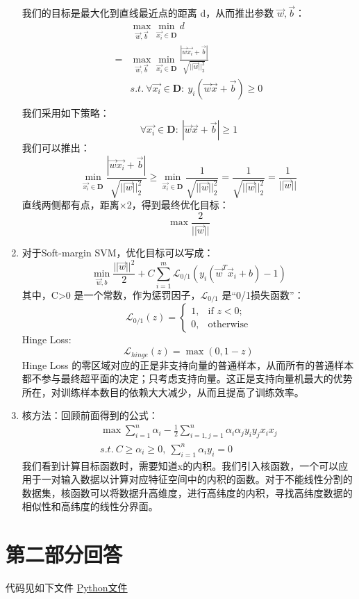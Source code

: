 \documentclass[a4paper,11pt,onecolumn,oneside,UTF8]{article}
\begin{document}
\begin{enumerate}
$$          $$
          我们的目标是最大化到直线最近点的距离 d，从而推出参数 $\vec{w},\vec{b}$：
          $$
              \begin{aligned}
                    & \max\limits_{\vec{w},\vec{b}}\min\limits_{\vec{x_i}\in\mathbf{D}} d                                                         \\
                  = & \max\limits_{\vec{w},\vec{b}}\min\limits_{\vec{x_i}\in\mathbf{D}} \frac{|\vec{w}\vec{x_i}+\vec{b}|}{\sqrt{||\vec{w}||_2^2}} \\
                    & s.t.\ \forall \vec{x_i}\in\mathbf{D}:\ y_i\left(\vec{w}\vec{x}+\vec{b}\right)\geq 0                                         \\
              \end{aligned}
          $$
          我们采用如下策略：
          $$
              \forall \vec{x_i}\in\mathbf{D}:\ |\vec{w}\vec{x}+\vec{b}|\geq 1
          $$
          我们可以推出：
          $$
              \min\limits_{\vec{x_i}\in\mathbf{D}} \frac{|\vec{w}\vec{x_i}+\vec{b}|}{\sqrt{||\vec{w}||_2^2}}\geq \min\limits_{\vec{x_i}\in\mathbf{D}} \frac{1}{\sqrt{||\vec{w}||_2^2}} = \frac{1}{\sqrt{||\vec{w}||_2^2}} = \frac{1}{||\vec{w}||}
          $$
          直线两侧都有点，距离×2，得到最终优化目标：
          $$
              \max \frac{2}{||\vec{w}||}
          $$
    \item
          对于Soft-margin SVM，优化目标可以写成：
          $$
              \min\limits_{\vec{w},b}\frac{||\vec{w}||^2}{2}+C\sum\limits_{i=1}^m \mathscr{L}_{0/1}\left(y_i\left(\vec{w}^T\vec{x}_i+b\right)-1\right)
          $$
          其中，C>0 是一个常数，作为惩罚因子，$\mathscr{L}_{0/1}$ 是“0/1损失函数”：
          $$
              \mathscr{L}_{0/1}\left(z\right) = \left\{\begin{array}{ll}
                  1, & \text{if }z<0;   \\
                  0, & \text{otherwise}
              \end{array}
              \right.
          $$
          Hinge Loss:
          $$
              \mathscr{L}_{hinge}\left(z\right) = \max\left(0,1-z\right)
          $$
          Hinge Loss 的零区域对应的正是非支持向量的普通样本，从而所有的普通样本都不参与最终超平面的决定；只考虑支持向量。这正是支持向量机最大的优势所在，对训练样本数目的依赖大大减少，从而且提高了训练效率。
    \item
          核方法：回顾前面得到的公式：
          $$
              \begin{aligned}
                  \max \sum \limits_{i=1}^n\alpha_i-\frac{1}{2}\sum\limits_{i=1,j=1}^n\alpha_i\alpha_jy_iy_jx_ix_j \\
                  s.t.\ C\geq\alpha_i\geq 0,\ \sum\limits_{i=1}^n\alpha_iy_i=0
              \end{aligned}
          $$
          我们看到计算目标函数时，需要知道x的内积。我们引入核函数，一个可以应用于一对输入数据以计算对应特征空间中的内积的函数。对于不能线性分割的数据集，核函数可以将数据升高维度，进行高纬度的内积，寻找高纬度数据的相似性和高纬度的线性分界面。
\end{enumerate}

\section*{第二部分回答}

代码见如下文件
\href{https://github.com/Allenem/PatternRecognition/blob/main/hw6/hw6.py}{Python文件}
\end{document}
